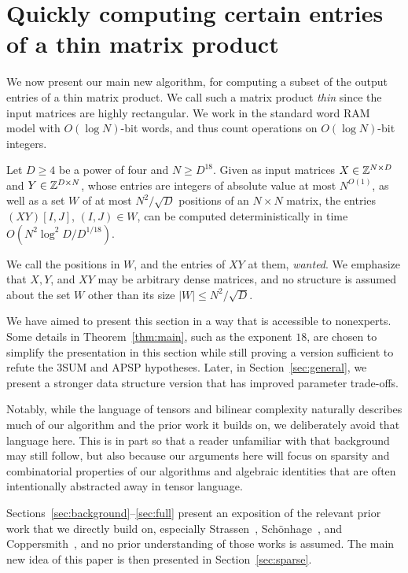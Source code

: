 \section{Quickly computing certain entries of a thin matrix product}\label{sec:result}

We now present our main new algorithm, for computing a subset of the output entries of a thin matrix product. We call such a matrix product \emph{thin} since the input matrices are highly rectangular. We work in the standard word RAM model with $O(\log N)$-bit words, and thus count operations on $O(\log N)$-bit integers.

\begin{theorem}\label{thm:main}
Let $D\ge4$ be a power of four and $N\ge D^{18}$. Given as input matrices $X\in\mathbb{Z}^{N\times D}$ and $Y\in\mathbb{Z}^{D\times N}$, whose entries are integers of absolute value at most $N^{O(1)}$, as well as a set $W$ of at most $N^2/\sqrt D$ positions of an $N \times N$ matrix, the entries $(XY)[I,J]$, $(I,J)\in W$, can be computed deterministically in time $O(N^2\log^2\!D/D^{1/18})$.
\end{theorem}

We call the positions in $W$, and the entries of $XY$ at them, \emph{wanted}. We emphasize that $X, Y$, and $XY$ may be arbitrary dense matrices, and no structure is assumed about the set $W$ other than its size $|W| \leq N^2/\sqrt D$. 

We have aimed to present this section in a way that is accessible to nonexperts. Some details in Theorem~\ref{thm:main}, such as the exponent $18$, are chosen to simplify the presentation in this section while still proving a version sufficient to refute the $3$SUM and APSP hypotheses. Later, in Section~\ref{sec:general}, we present a stronger data structure version that has improved parameter trade-offs.

Notably, while the language of tensors and bilinear complexity naturally describes much of our algorithm and the prior work it builds on, we deliberately avoid that language here. This is in part so that a reader unfamiliar with that background may still follow, but also because our arguments here will focus on sparsity and combinatorial properties of our algorithms and algebraic identities that are often intentionally abstracted away in tensor language.

Sections~\ref{sec:background}--\ref{sec:full} present an exposition of the relevant prior work that we directly build on, especially Strassen~\cite{Str69},  Sch\"onhage~\cite{Sch81}, and Coppersmith~\cite{Cop82}, and no prior understanding of those works is assumed. The main new idea of this paper is then presented in Section~\ref{sec:sparse}. 

